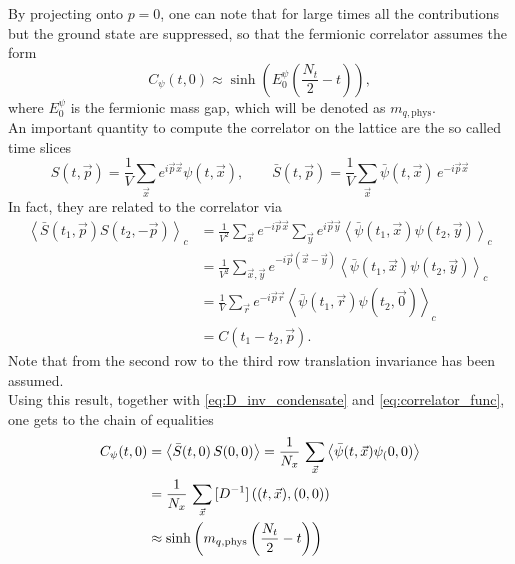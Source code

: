 By projecting onto $p=0$, one can note that for large times all the contributions but the ground state are suppressed, so that 
the fermionic correlator assumes the form 
\begin{equation}
    C_\psi(t,0) \approx \sinh \left(E_0^{\psi} \left(\frac{N_t}{2} - t\right)\right),
    \label{eq:correlator_func}
\end{equation}
where $E_0^{\psi}$ is the fermionic mass gap, which will be denoted as $m_{q,\text{phys}}$. \\
An important quantity to compute the correlator on the lattice are the so called time slices
\begin{equation*} 
    S(t, \vec{p})=\frac{1}{V} \sum_{\vec{x}} e^{i \vec{p} \vec{x}} \psi(t, \vec{x}), \qquad \bar{S}(t, \vec{p})=\frac{1}{V} \sum_{\vec{x}} \bar\psi(t, \vec{x}) \, e^{-i \vec{p} \vec{x}}
\end{equation*}
In fact, they are related to the correlator via
\begin{equation*}
    \begin{aligned}
        \left\langle \bar{S}\left(t_1, \vec{p}\right) S\left(t_2,-\vec{p}\right)\right\rangle_c & =\frac{1}{V^2} \sum_{\vec{x}} e^{-i \vec{p} \vec{x}} \sum_{\vec{y}} e^{i \vec{p} \vec{y}}\left\langle\bar\psi\left(t_1, \vec{x}\right) \psi\left(t_2, \vec{y}\right)\right\rangle_c \\
        & =\frac{1}{V^2} \sum_{\vec{x}, \vec{y}} e^{-i \vec{p}(\vec{x}-\vec{y})}\left\langle\bar\psi\left(t_1, \vec{x}\right) \psi\left(t_2, \vec{y}\right)\right\rangle_c \\
        & =\frac{1}{V} \sum_{\vec{r}} e^{-i \vec{p} \vec{r}}\left\langle\bar\psi\left(t_1, \vec{r}\right) \psi\left(t_2, \vec{0}\right)\right\rangle_c \\
        & =C\left(t_1-t_2, \vec{p}\right) .
        \end{aligned}
\end{equation*}
Note that from the second row to the third row translation invariance has been assumed. \\
Using this result, together with \eqref{eq:D_inv_condensate} and \eqref{eq:correlator_func}, one gets to the chain of equalities
\begin{equation*}
    \begin{aligned}
        C_\psi(t, 0)  &= \left\langle \bar{S}(t,0) \, S(0,0) \right\rangle = \frac{1}{N_x} \,  \sum_{\vec{x}} \left\langle \bar\psi(t,\vec{x}) \psi_(0,0) \right\rangle \\
        &= \frac{1}{N_x} \, \sum_{\vec{x}} \, [D^{-1}] \left((t,\vec{x}),(0,0)\right) \\
        &\approx \sinh\left(m_{q, \text{phys}}\left(\frac{N_t}{2} - t\right)\right)
    \end{aligned}
\end{equation*}
